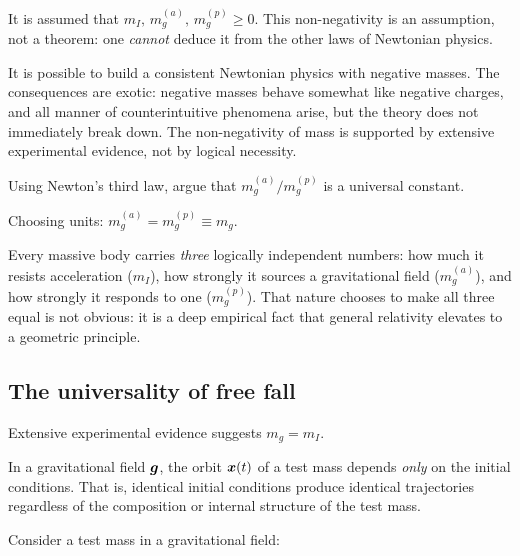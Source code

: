 It is assumed that $m_I,\, m_g^{(a)},\, m_g^{(p)} \geq 0$.  This
non-negativity is an assumption, not a theorem: one \emph{cannot}
deduce it from the other laws of Newtonian physics.

\begin{remark}
  It is possible to build a consistent Newtonian physics with negative
  masses.  The consequences are exotic: negative masses behave
  somewhat like negative charges, and all manner of counterintuitive
  phenomena arise, but the theory does not immediately break down.
  The non-negativity of mass is supported by extensive experimental
  evidence, not by logical necessity.
\end{remark}

\begin{exercise}
  Using Newton's third law, argue that $m_g^{(a)}/m_g^{(p)}$ is a
  universal constant.
\end{exercise}

Choosing units: $m_g^{(a)} = m_g^{(p)} \equiv m_g$.

\begin{intuition}
  Every massive body carries \emph{three} logically independent
  numbers: how much it resists acceleration ($m_I$), how strongly
  it sources a gravitational field ($m_g^{(a)}$), and how strongly
  it responds to one ($m_g^{(p)}$).  That nature chooses to make all
  three equal is not obvious: it is a deep empirical fact that general
  relativity elevates to a geometric principle.
\end{intuition}

\subsection{The universality of free fall}\label{sec:UFF}

Extensive experimental evidence suggests $m_g = m_I$.

\begin{definition}\label{def:UFF}
  In a gravitational field $\boldsymbol{g}$, the orbit $\boldsymbol{x}(t)$ of a test mass
  depends \emph{only} on the initial conditions.  That is, identical
  initial conditions produce identical trajectories regardless of the
  composition or internal structure of the test mass.
\end{definition}

Consider a test mass in a gravitational field:


